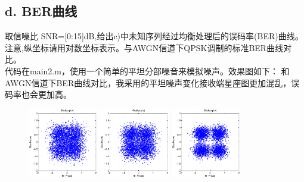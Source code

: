 \documentclass{article}
\begin{document}
\subsection*{d. BER曲线}
取信噪比 SNR=[0:15]dB,给出c)中未知序列经过均衡处理后的误码率(BER)曲线。
注意,纵坐标请用对数坐标表示。与AWGN信道下QPSK调制的标准BER曲线对比。\\
代码在main2.m，使用一个简单的平坦分部噪音来模拟噪声。效果图如下：
和AWGN信道下BER曲线对比，我采用的平坦噪声变化接收端星座图更加混乱，误码率也会更加高。
\begin{figure}[h]
\begin{minipage}[t]{0.32\linewidth}
\centering
\includegraphics[width=1.2in]{61.eps}
\end{minipage}%
\begin{minipage}[t]{0.32\linewidth}
\centering
\includegraphics[width=1.2in]{62.eps}
\end{minipage}%
\begin{minipage}[t]{0.32\linewidth}
\centering
\includegraphics[width=1.2in]{65.eps}
\end{minipage}%
\end{figure}
\end{document}
